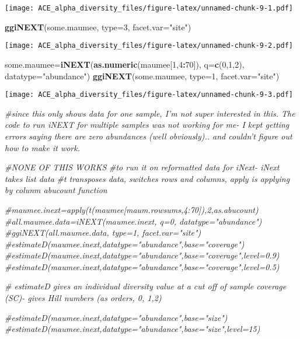 \documentclass[]{article}
\newenvironment{Shaded}{\begin{snugshade}}{\end{snugshade}}
\newcommand{\KeywordTok}[1]{\textcolor[rgb]{0.13,0.29,0.53}{\textbf{#1}}}
\newcommand{\DataTypeTok}[1]{\textcolor[rgb]{0.13,0.29,0.53}{#1}}
\newcommand{\DecValTok}[1]{\textcolor[rgb]{0.00,0.00,0.81}{#1}}
\newcommand{\StringTok}[1]{\textcolor[rgb]{0.31,0.60,0.02}{#1}}
\newcommand{\CommentTok}[1]{\textcolor[rgb]{0.56,0.35,0.01}{\textit{#1}}}
\newcommand{\OperatorTok}[1]{\textcolor[rgb]{0.81,0.36,0.00}{\textbf{#1}}}
\newcommand{\NormalTok}[1]{#1}
\begin{document}
\texttt{[image: ACE\_alpha\_diversity\_files/figure-latex/unnamed-chunk-9-1.pdf]}

\begin{Shaded}
\begin{Highlighting}[]
\KeywordTok{ggiNEXT}\NormalTok{(some.maumee, }\DataTypeTok{type=}\DecValTok{3}\NormalTok{, }\DataTypeTok{facet.var=}\StringTok{"site"}\NormalTok{)}
\end{Highlighting}
\end{Shaded}

\texttt{[image: ACE\_alpha\_diversity\_files/figure-latex/unnamed-chunk-9-2.pdf]}

\begin{Shaded}
\begin{Highlighting}[]
\NormalTok{some.maumee=}\KeywordTok{iNEXT}\NormalTok{(}\KeywordTok{as.numeric}\NormalTok{(maumee[}\DecValTok{1}\NormalTok{,}\DecValTok{4}\OperatorTok{:}\DecValTok{70}\NormalTok{]), }\DataTypeTok{q=}\KeywordTok{c}\NormalTok{(}\DecValTok{0}\NormalTok{,}\DecValTok{1}\NormalTok{,}\DecValTok{2}\NormalTok{), }\DataTypeTok{datatype=}\StringTok{"abundance"}\NormalTok{)}
\KeywordTok{ggiNEXT}\NormalTok{(some.maumee, }\DataTypeTok{type=}\DecValTok{1}\NormalTok{, }\DataTypeTok{facet.var=}\StringTok{"site"}\NormalTok{)}
\end{Highlighting}
\end{Shaded}

\texttt{[image: ACE\_alpha\_diversity\_files/figure-latex/unnamed-chunk-9-3.pdf]}

\begin{Shaded}
\begin{Highlighting}[]
\CommentTok{#since this only shows data for one sample, I'm not super interested in this. The code to run iNEXT for multiple samples was not working for me- I kept getting errors saying there are zero abundances (well obviously).. and couldn't figure out how to make it work. }

\CommentTok{#NONE OF THIS WORKS}
\CommentTok{#to run it on reformatted data for iNext- iNext takes list data}
\CommentTok{#t transposes data, switches rows and columns, apply is applying by colunm abucount function}

\CommentTok{#maumee.inext=apply(t(maumee[maum.rowsums,4:70]),2,as.abucount)}
\CommentTok{#all.maumee.data=iNEXT(maumee.inext, q=0, datatype="abundance")}
\CommentTok{#ggiNEXT(all.maumee.data, type=1, facet.var="site")}
\CommentTok{#estimateD(maumee.inext,datatype="abundance",base="coverage")}
\CommentTok{#estimateD(maumee.inext,datatype="abundance",base="coverage",level=0.9)}
\CommentTok{#estimateD(maumee.inext,datatype="abundance",base="coverage",level=0.5)}

\CommentTok{# estimateD gives an individual diversity value at a cut off of sample coverage (SC)- gives Hill numbers (as orders, 0, 1,2)}

\CommentTok{#estimateD(maumee.inext,datatype="abundance",base="size")}
\CommentTok{#estimateD(maumee.inext,datatype="abundance",base="size",level=15)}
\end{Highlighting}
\end{Shaded}
\end{document}
